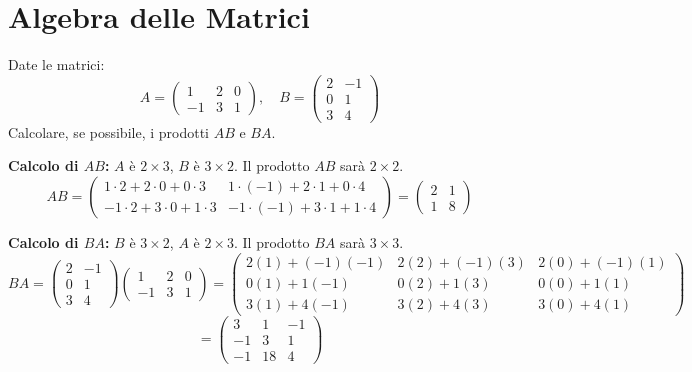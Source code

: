\section{Algebra delle Matrici}

\begin{exercisebox}[title={Esercizio 1: Prodotto Righe per Colonne}]
Date le matrici:
$$ A = \begin{pmatrix} 1 & 2 & 0 \\ -1 & 3 & 1 \end{pmatrix}, \quad B = \begin{pmatrix} 2 & -1 \\ 0 & 1 \\ 3 & 4 \end{pmatrix} $$
Calcolare, se possibile, i prodotti $AB$ e $BA$.
\end{exercisebox}

\begin{solbox}
\textbf{Calcolo di $AB$:}
$A$ è $2 \times 3$, $B$ è $3 \times 2$. Il prodotto $AB$ sarà $2 \times 2$.
$$ AB = \begin{pmatrix} 1\cdot 2 + 2\cdot 0 + 0\cdot 3 & 1\cdot(-1) + 2\cdot 1 + 0\cdot 4 \\ -1\cdot 2 + 3\cdot 0 + 1\cdot 3 & -1\cdot(-1) + 3\cdot 1 + 1\cdot 4 \end{pmatrix} 
= \begin{pmatrix} 2 & 1 \\ 1 & 8 \end{pmatrix} $$

\textbf{Calcolo di $BA$:}
$B$ è $3 \times 2$, $A$ è $2 \times 3$. Il prodotto $BA$ sarà $3 \times 3$.
$$ BA = \begin{pmatrix} 2 & -1 \\ 0 & 1 \\ 3 & 4 \end{pmatrix} \begin{pmatrix} 1 & 2 & 0 \\ -1 & 3 & 1 \end{pmatrix} =
\begin{pmatrix} 
2(1)+(-1)(-1) & 2(2)+(-1)(3) & 2(0)+(-1)(1) \\
0(1)+1(-1) & 0(2)+1(3) & 0(0)+1(1) \\
3(1)+4(-1) & 3(2)+4(3) & 3(0)+4(1)
\end{pmatrix} $$
$$ = \begin{pmatrix} 3 & 1 & -1 \\ -1 & 3 & 1 \\ -1 & 18 & 4 \end{pmatrix} $$
\end{solbox}

